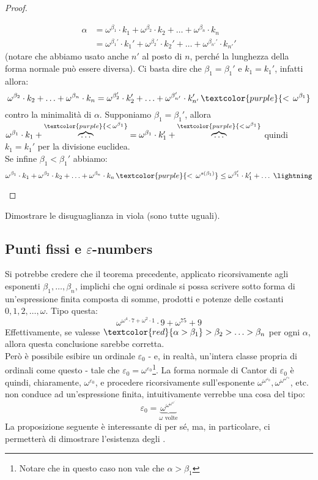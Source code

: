 \documentclass[11pt]{scrartcl}
\begin{document}
\begin{proof}
\begin{itemize}
		\[ \begin{split}
			\alpha &= \omega^{\beta_1} \cdot k_1 + \omega^{\beta_2} \cdot k_2 + \ldots + \omega^{\beta_n} \cdot k_n \\
				   &= \omega^{\beta_1'} \cdot k_1' + \omega^{\beta_2'} \cdot k_2' + \ldots + \omega^{\beta_{n'}'} \cdot k_{n'}'
		\end{split}
			\]
		(notare che abbiamo usato anche $n'$ al posto di $n$, perché la lunghezza della forma normale può essere diversa). Ci basta dire che $\beta_1 = \beta_1'$ e $k_1 = k_1'$, infatti allora:
		\[ \omega^{\beta_2} \cdot k_2 + \ldots + \omega^{\beta_n} \cdot k_n = \omega^{\beta_2'} \cdot k_2' + \ldots + \omega^{\beta_{n'}'} \cdot k_{n'}'\, \textcolor{purple}{<\, \omega^{\beta_1}} 
			\]
		contro la minimalità di $\alpha$. Supponiamo $\beta_1 = \beta_1'$, allora $\omega^{\beta_1} \cdot k_1 + \overbrace{\ldots}^{\textcolor{purple}{<\,\omega^{\beta_1}}} = \omega^{\beta_1} \cdot k_1' + \overbrace{\ldots}^{\textcolor{purple}{<\, \omega^{\beta_1}}}$ quindi $k_1 = k_1'$ per la divisione euclidea.\\
		Se infine $\beta_1 < \beta_1'$ abbiamo:
		\[ \omega^{\beta_1} \cdot k_1 + \omega^{\beta_2} \cdot k_2 + \ldots + \omega^{\beta_n} \cdot k_n \, \textcolor{purple}{<\, \omega^{s(\beta_1)}} \leq \omega^{\beta_1'} \cdot k_1' + \ldots \; \lightning
			\]
	\end{itemize}
\end{proof}

\begin{exercise}
	Dimostrare le disuguaglianza in viola (sono tutte uguali).
\end{exercise}

\subsection{Punti fissi e \texorpdfstring{$\varepsilon$}{epsilon}-numbers}
Si potrebbe credere che il teorema precedente, applicato ricorsivamente agli esponenti $\beta_1,\ldots,\beta_n$, implichi che ogni ordinale
si possa scrivere sotto forma di un'espressione finita composta di somme, prodotti e potenze delle costanti $0,1,2,\ldots,\omega$. Tipo questa:
\[ \omega^{\omega^4 \cdot 7 + \omega^2 \cdot 1}\cdot 9 + \omega^{75} + 9
	\]
Effettivamente, se valesse $\textcolor{red}{\alpha > \beta_1}>\beta_2>\ldots>\beta_n$ per ogni $\alpha$, allora questa conclusione sarebbe corretta.\\
Però è possibile esibire un ordinale $\varepsilon_0$ - e, in realtà, un'intera classe propria di ordinali come questo - tale che $\varepsilon_0 = \omega^{\varepsilon_0}$\footnote{Notare che in questo caso non vale che $\alpha > \beta_1$}.
La forma normale di Cantor di $\varepsilon_0$ è quindi, chiaramente, $\omega^{\varepsilon_0}$, e procedere ricorsivamente sull'esponente $\omega^{\omega^{\varepsilon_0}},\omega^{\omega^{\omega^{\varepsilon_0}}}$, etc. non conduce ad un'espressione finita, intuitivamente verrebbe una cosa del tipo:
\[ \varepsilon_0 = \underbrace{\omega^{\omega^{\omega^{\omega^{\iddots}}}}}_{\text{$\omega$ volte}}
	\]
La proposizione seguente è interessante di per sé, ma, in particolare, ci permetterà di dimostrare l'esistenza degli .
\end{document}
